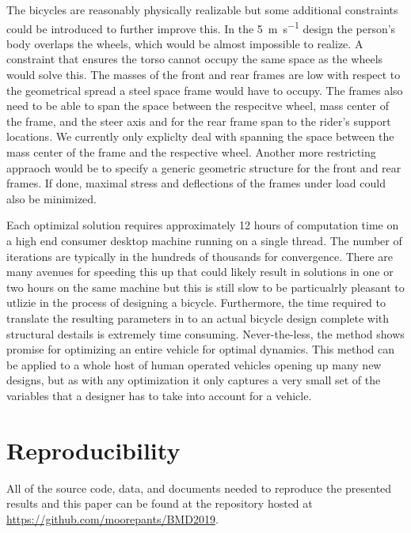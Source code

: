 \documentclass{bmd2019a}
\begin{document}
The bicycles are reasonably physically realizable but some additional
constraints could be introduced to further improve this. In the
5~\si{\meter\per\second} design the person's body overlaps the wheels, which
would be almost impossible to realize. A constraint that ensures the torso
cannot occupy the same space as the wheels would solve this. The masses of the
front and rear frames are low with respect to the geometrical spread a steel
space frame would have to occupy. The frames also need to be able to span the
space between the respecitve wheel, mass center of the frame, and the steer
axis and for the rear frame span to the rider's support locations. We currently
only expliclty deal with spanning the space between the mass center of the
frame and the respective wheel. Another more restricting appraoch would be to
specify a generic geometric structure for the front and rear frames. If done,
maximal stress and deflections of the frames under load could also be
minimized.

Each optimizal solution requires approximately 12 hours of computation time on
a high end consumer desktop machine running on a single thread. The number of
iterations are typically in the hundreds of thousands for convergence. There
are many avenues for speeding this up that could likely result in solutions in
one or two hours on the same machine but this is still slow to be particualrly
pleasant to utlizie in the process of designing a bicycle. Furthermore, the
time required to translate the resulting parameters in to an actual bicycle
design complete with structural destails is extremely time consuming.
Never-the-less, the method shows promise for optimizing an entire vehicle for
optimal dynamics. This method can be applied to a whole host of human operated
vehicles opening up many new designs, but as with any optimization it only
captures a very small set of the variables that a designer has to take into
account for a vehicle.

\section{Reproducibility}
%
All of the source code, data, and documents needed to reproduce the presented
results and this paper can be found at the repository hosted at
\url{https://github.com/moorepants/BMD2019}.



\end{document}
